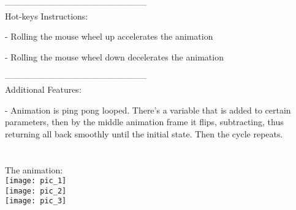 -------------------------------------------------- \\

Hot-keys Instructions:

- Rolling the mouse wheel up accelerates the animation

- Rolling the mouse wheel down decelerates the animation

-------------------------------------------------- \\

Additional Features:

- Animation is ping pong looped. There's a variable that is added to certain parameters, then by the middle animation frame it flips, subtracting, thus returning all back smoothly until the initial state. 
Then the cycle repeats. \\\\\\


The animation:\\

\texttt{[image: pic\_1]} \\

\texttt{[image: pic\_2]} \\

\texttt{[image: pic\_3]} \\



\clearpage